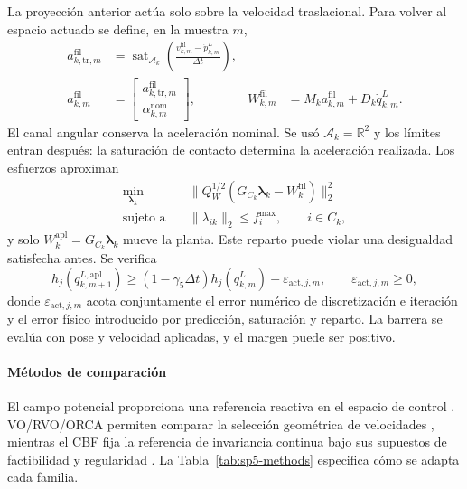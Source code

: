 La proyección anterior actúa solo sobre la velocidad traslacional. Para volver al espacio actuado se define, en la muestra $m$,
\begin{equation}
\begin{aligned}
 a_{k,\mathrm{tr},m}^{\mathrm{fil}}
 &=\operatorname{sat}_{\mathcal A_k}\!\left(
   \frac{v_{k,m}^{\mathrm{fil}}-\dot p_{k,m}^L}{\Delta t}\right),\\
 a_{k,m}^{\mathrm{fil}}
 &=\begin{bmatrix}a_{k,\mathrm{tr},m}^{\mathrm{fil}}\\
                    \alpha_{k,m}^{\mathrm{nom}}\end{bmatrix},
 &
 W_{k,m}^{\mathrm{fil}}
 &=M_k a_{k,m}^{\mathrm{fil}}+D_k\dot q_{k,m}^L .
\end{aligned}
\label{eq:sp5-velocity-to-wrench}
\end{equation}
El canal angular conserva la aceleración nominal. Se usó $\mathcal A_k=\mathbb R^2$ y los límites entran después: la saturación de contacto determina la aceleración realizada. Los esfuerzos aproximan
\begin{equation}
\label{eq:sp5-wrench-allocation}
\begin{aligned}
  \min_{\boldsymbol\lambda_k}\quad&
  \lVert Q_W^{1/2}(G_{C_k}\boldsymbol\lambda_k-W_k^{\mathrm{fil}})\rVert_2^2\\
  \text{sujeto a}\quad&
  \lVert\lambda_{ik}\rVert_2\leq f_i^{\max},
  \qquad i\in C_k ,
\end{aligned}
\end{equation}
y solo $W_k^{\mathrm{apl}}=G_{C_k}\boldsymbol\lambda_k$ mueve la planta. Este reparto puede violar una desigualdad satisfecha antes. Se verifica
\begin{equation}
 h_j(q_{k,m+1}^{L,\mathrm{apl}})
 \geq(1-\gamma_5\Delta t)h_j(q_{k,m}^{L})
       -\varepsilon_{\mathrm{act},j,m},
 \qquad \varepsilon_{\mathrm{act},j,m}\geq0,
 \label{eq:sp5-applied-margin}
\end{equation}
donde $\varepsilon_{\mathrm{act},j,m}$ acota conjuntamente el error numérico de discretización e iteración y el error físico introducido por predicción, saturación y reparto. La barrera se evalúa con pose y velocidad aplicadas, y el margen puede ser positivo.

\paragraph{Métodos de comparación}

El campo potencial proporciona una referencia reactiva en el espacio de control \parencite{khatib1986obstacle}. VO/RVO/ORCA permiten comparar la selección geométrica de velocidades \parencite{fiorini1998velocity,vandenberg2008rvo,vandenberg2011orca}, mientras el CBF fija la referencia de invariancia continua bajo sus supuestos de factibilidad y regularidad \parencite{ames2017cbf}. La Tabla~\ref{tab:sp5-methods} especifica cómo se adapta cada familia.

